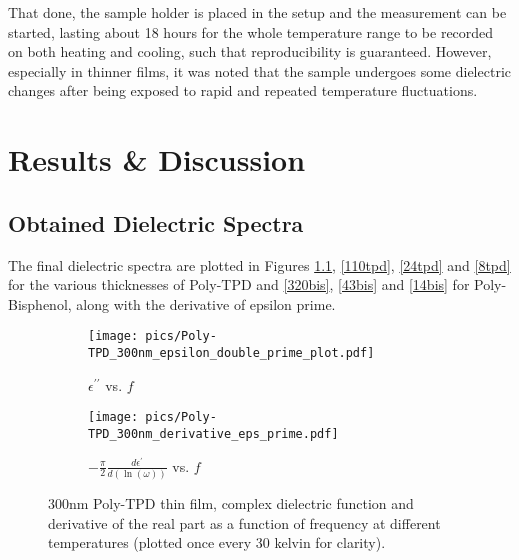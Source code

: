 That done, the sample holder is placed in the setup and the measurement can be started, lasting about 18 hours for the whole temperature range to be recorded on both heating and cooling, such that reproducibility is guaranteed. However, especially in thinner films, it was noted that the sample undergoes some dielectric changes after being exposed to rapid and repeated temperature fluctuations.

\chapter{Results \& Discussion}

\section{Obtained Dielectric Spectra}
The final dielectric spectra are plotted in Figures \ref{300tpd}, \ref{110tpd}, \ref{24tpd} and \ref{8tpd} for the various thicknesses of Poly-TPD and \ref{320bis}, \ref{43bis} and \ref{14bis} for Poly-Bisphenol, along with the derivative of epsilon prime.
%

\begin{figure}[!htb]
\centering
\begin{subfigure}[t]{.5\textwidth}
  \centering
  \texttt{[image: pics/Poly-TPD\_300nm\_epsilon\_double\_prime\_plot.pdf]}
  \caption{$\epsilon^{\prime\prime}$ vs. $f$}
\end{subfigure}%
\begin{subfigure}[t]{.5\textwidth}
  \centering
  \texttt{[image: pics/Poly-TPD\_300nm\_derivative\_eps\_prime.pdf]}
  \caption{$-\frac{\pi}{2}\frac{d\epsilon^{\prime}}{d\left(\ln \left( \omega \right)   \right) }$ vs. $f$}
\end{subfigure}
\caption{300nm Poly-TPD thin film, complex dielectric function and derivative of the real part as a function of frequency at different temperatures (plotted once every 30 kelvin for clarity).}
  \label{300tpd}
\end{figure}


